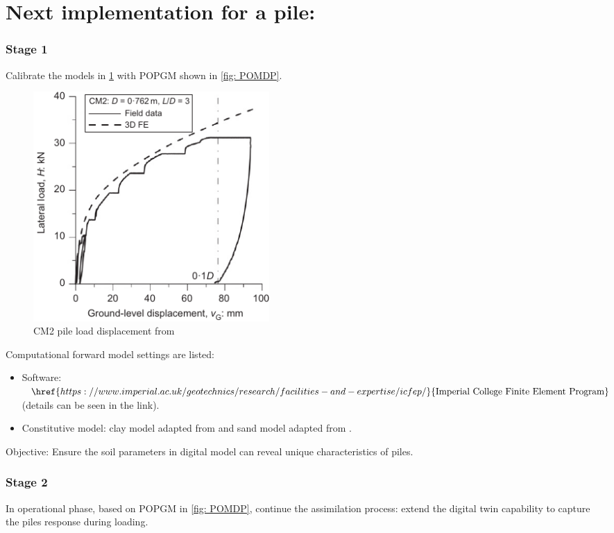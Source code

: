 \section{Next implementation for a pile:}


\subsubsection{Stage 1}
Calibrate the models in \cref{fig: CM2pile} with \acrshort{POPGM} shown in \cref{fig: POMDP}.
\begin{figure}[H]
    \centering
    \includegraphics[width = 90mm]{Figures/figure-CM2.pdf}
\caption{CM2 pile load displacement from \protect\cite{zdravkovic2020}}
\label{fig: CM2pile}
\end{figure}
Computational forward model settings are listed:
\begin{itemize}[left=0cm]
    \item Software: $\href{https://www.imperial.ac.uk/geotechnics/research/facilities-and-expertise/icfep/}{\rm{Imperial \ College \ Finite\ Element\ Program}}$ (details can be seen in the link).
    \item Constitutive model: clay model adapted from \cite{zdravkovic2020} and sand model adapted from \cite{taborda2020}.
\end{itemize}
Objective: Ensure the soil parameters in digital model can reveal unique characteristics of piles.

\subsubsection{Stage 2}
In operational phase, based on \acrshort{POPGM} in \cref{fig: POMDP}, continue the assimilation process: extend the digital twin capability to capture the piles response during loading.

